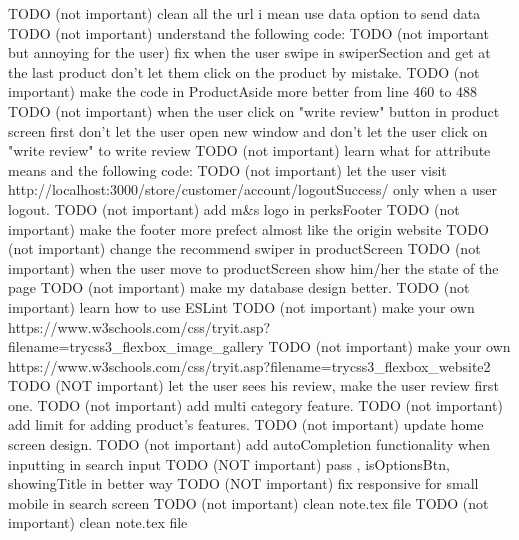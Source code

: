 TODO (not important) clean all the url i mean use data option to send data 
TODO (not important) understand the following code:
TODO (not important but annoying for the user) fix when the user swipe in swiperSection and get at the last product don't let them click on the product by mistake.
TODO (not important) make the code in ProductAside more better from line 460 to 488
TODO (not important) when the user click on "write review" button in product screen first don't let the user open new window and don't let the user click on "write review" to write review
TODO (not important) learn what for attribute means and the following code:
TODO (not important) let the user visit http://localhost:3000/store/customer/account/logoutSuccess/ only when a user logout.
TODO (not important) add m&s logo in perksFooter
TODO (not important) make the footer more prefect almost like the origin website
TODO (not important) change the recommend swiper in productScreen
TODO (not important) when the user move to productScreen show him/her the state of the page
TODO (not important) make my database design better.
TODO (not important) learn how to use ESLint
TODO (not important) make your own https://www.w3schools.com/css/tryit.asp?filename=trycss3_flexbox_image_gallery
TODO (not important) make your own https://www.w3schools.com/css/tryit.asp?filename=trycss3_flexbox_website2
TODO (NOT important) let the user sees his review, make the user review first one.
TODO (not important) add multi category feature.
TODO (not important) add limit for adding product's features. 
TODO (not important) update home screen design.
TODO (not important) add autoCompletion functionality when inputting in search input
TODO (NOT important) pass , isOptionsBtn, showingTitle in better way 
TODO (NOT important) fix responsive for small mobile in search screen
TODO (not important) clean note.tex file
TODO (not important) clean note.tex file
